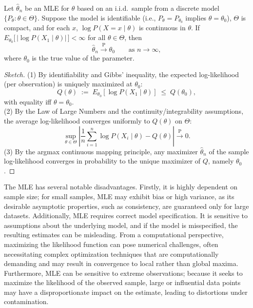 \begin{proposition}
Let \( \hat{\theta}_n \) be an MLE for \( \theta \) based on an i.i.d.\ sample from a discrete model \( \{P_{\theta} : \theta \in \Theta\} \). Suppose the model is identifiable (i.e., \(P_{\theta} = P_{\theta_0}\) implies \(\theta=\theta_0\)), \(\Theta\) is compact, and for each \(x\), \( \log P(X=x \mid \theta) \) is continuous in \(\theta\). If \(E_{\theta_0}\big[\,|\log P(X_1 \mid \theta)|\,\big] < \infty\) for all \(\theta\in\Theta\), then
\[
\hat{\theta}_n \xrightarrow{\mathrm{P}} \theta_0 \qquad \text{as } n \to \infty,
\]
where \( \theta_0 \) is the true value of the parameter.
\end{proposition}
\begin{proof}[Sketch]
(1) By identifiability and Gibbs' inequality, the expected log-likelihood (per observation) is uniquely maximized at \(\theta_0\):
\[
Q(\theta) \;:=\; E_{\theta_0}\!\left[\log P(X_1 \mid \theta)\right]
\;\le\; Q(\theta_0),
\]
with equality iff \(\theta=\theta_0\). \\
(2) By the Law of Large Numbers and the continuity/integrability assumptions, the average log-likelihood converges uniformly to \(Q(\theta)\) on \(\Theta\):
\[
\sup_{\theta \in \Theta}\left|\frac{1}{n}\sum_{i=1}^n \log P(X_i \mid \theta) - Q(\theta)\right| \xrightarrow{\mathrm{P}} 0.
\]
(3) By the argmax continuous mapping principle, any maximizer \(\hat{\theta}_n\) of the sample log-likelihood converges in probability to the unique maximizer of \(Q\), namely \(\theta_0\).
\end{proof}

The MLE has several notable disadvantages. Firstly, it is highly dependent on sample size; for small samples, MLE may exhibit bias or high variance, as its desirable asymptotic properties, such as consistency, are guaranteed only for large datasets. Additionally, MLE requires correct model specification. It is sensitive to assumptions about the underlying model, and if the model is misspecified, the resulting estimates can be misleading. From a computational perspective, maximizing the likelihood function can pose numerical challenges, often necessitating complex optimization techniques that are computationally demanding and may result in convergence to local rather than global maxima. Furthermore, MLE can be sensitive to extreme observations; because it seeks to maximize the likelihood of the observed sample, large or influential data points may have a disproportionate impact on the estimate, leading to distortions under contamination.

